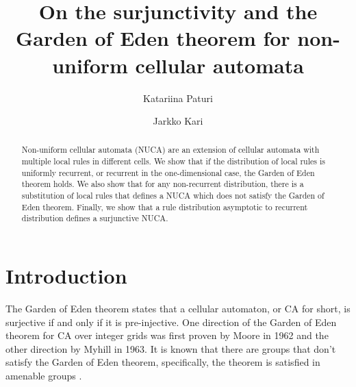 \documentclass[runningheads]{llncs}
\begin{document}
\title{On the surjunctivity and the Garden of Eden theorem for non-uniform cellular automata}
%
%
\author{Katariina Paturi  \and Jarkko Kari  } %
%
%
%
\maketitle              %
%
\begin{abstract}
Non-uniform cellular automata (NUCA) are an extension of cellular automata with multiple local rules in different cells. We show that if the distribution of local rules is uniformly recurrent, or recurrent in the one-dimensional case, the Garden of Eden theorem holds. We also show that for any non-recurrent distribution, there is a substitution of local rules that defines a NUCA which does not satisfy the Garden of Eden theorem. Finally, we show that a rule distribution asymptotic to recurrent distribution defines a surjunctive NUCA.

\end{abstract}
%
%
%

\section{Introduction}

The Garden of Eden theorem states that a cellular automaton, or CA for short, is surjective if and only if it is pre-injective. One direction of the Garden of Eden theorem for CA over integer grids was first proven by Moore in 1962 and the other direction by Myhill in 1963. It is known that there are groups that don't satisfy the Garden of Eden theorem, specifically, the theorem is satisfied in amenable groups \cite{cecc,moore,myhill}.
\end{document}

